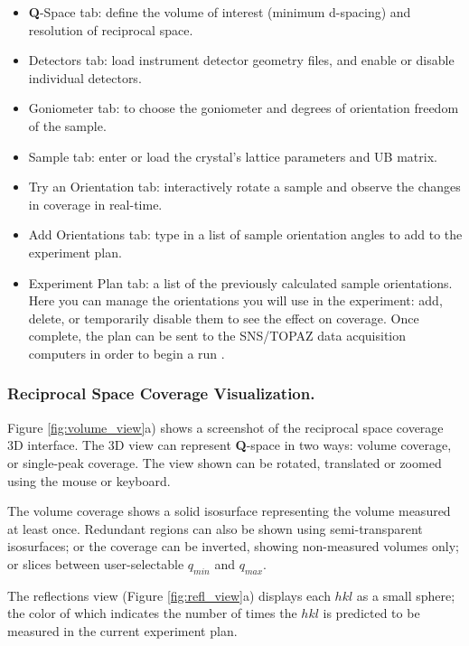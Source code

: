 \documentclass[final]{iucr}              %
\begin{document}
\begin{itemize}
  	\item {\bf Q}-Space tab: define the volume of interest (minimum d-spacing)
  	and resolution of reciprocal space. 
 	\item Detectors tab: load instrument detector geometry
files, and enable or disable individual detectors. 
	\item Goniometer tab: to choose the
goniometer and degrees of orientation freedom of the sample.
  	\item Sample tab: enter or load the crystal's lattice parameters and UB
  matrix.
  	\item Try an Orientation tab: interactively rotate a sample and observe the
  changes in coverage in real-time.
  	\item Add Orientations tab: type in a list of sample orientation angles to
  add to the experiment plan.
 
  	\item Experiment Plan tab: a list of the previously calculated sample
orientations. Here you can manage the orientations you will use in the experiment: add,
delete, or temporarily disable them to see the effect on coverage. Once
complete, the plan can be sent to the SNS/TOPAZ data acquisition computers in
order to begin a run \cite{SNSDAS}.
    
\end{itemize} 



\subsubsection{Reciprocal Space Coverage Visualization.}
Figure \ref{fig:volume_view}a) shows a screenshot of the reciprocal space
coverage 3D interface. The 3D view can represent {\bf Q}-space in two ways: volume coverage, or single-peak
coverage. The view shown can be rotated, translated or zoomed using the mouse or
keyboard.

The volume coverage shows a solid isosurface representing the volume measured at
least once. Redundant regions can also be shown using semi-transparent
isosurfaces; or the coverage can be inverted, showing non-measured volumes only;
or slices between user-selectable $q_{min}$ and $q_{max}$.        

The reflections view (Figure \ref{fig:refl_view}a) displays each $hkl$ as a
small sphere; the color of which indicates the number of times the $hkl$ is
predicted to be measured in the current experiment plan.        
\end{document}
